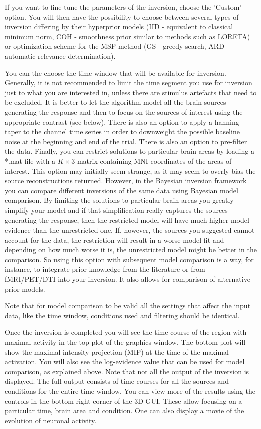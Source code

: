 If you want to fine-tune the parameters of the inversion, choose the 'Custom' option.
You will then have the possibility to choose between several types of inversion differing by their hyperprior models (IID - equivalent to classical
minimum norm, COH - smoothness prior similar to methods such as LORETA) or optimization scheme for the MSP method (GS - greedy search, ARD - automatic
relevance determination). 

You can the choose the time window that will be available for inversion. Generally, it is not recommended to limit the time
segment you use for inversion just to what you are interested in, unless there are stimulus artefacts
that need to be excluded. It is better to let the algorithm model all the brain sources generating the response and then to focus on the sources
of interest using the appropriate contrast (see below). There is also an option to apply a hanning taper to the channel time series in order to downweight
the possible baseline noise at the beginning and end of the trial. There is also an option to pre-filter the data. 
Finally, you can restrict solutions to particular
brain areas by loading a *.mat file with a $K \times 3$ matrix containing MNI coordinates of the areas of interest. This option may initially seem strange, as it may seem to overly bias the source reconstructions returned. However, in the Bayesian inversion
framework you can compare different inversions of the same data using Bayesian model comparison. By limiting
the solutions to particular brain areas you greatly simplify your model and if that simplification really captures the sources generating the response, then
the restricted model will have much higher model evidence than the unrestricted one. If, however, the sources you suggested cannot account for the data,
the restriction will result in a worse model fit and depending on how much worse it is, the unrestricted model might be better in the comparison. So using
this option with subsequent model comparison is a way, for instance, to integrate prior knowledge from the literature or from fMRI/PET/DTI into your
inversion. It also allows for comparison of alternative prior models. 

Note that for model comparison to be valid all the settings that affect the input data,
like the time window, conditions used and filtering should be identical.

Once the inversion is completed you will see 
the time course of the region with maximal activity in the top plot of the graphics window. 
The bottom plot will show the maximal intensity projection (MIP) at the time of the maximal activation. You will also see the log-evidence value that can
be used for model comparison, as explained above. Note that not all the output of the inversion is displayed. The full output consists of time courses
for all the sources and conditions for the entire time window. You can view more of the results using the controls in the bottom right corner
of the 3D GUI. These allow focusing on a particular time, brain area and condition. One can also display a movie of the evolution of neuronal activity.

